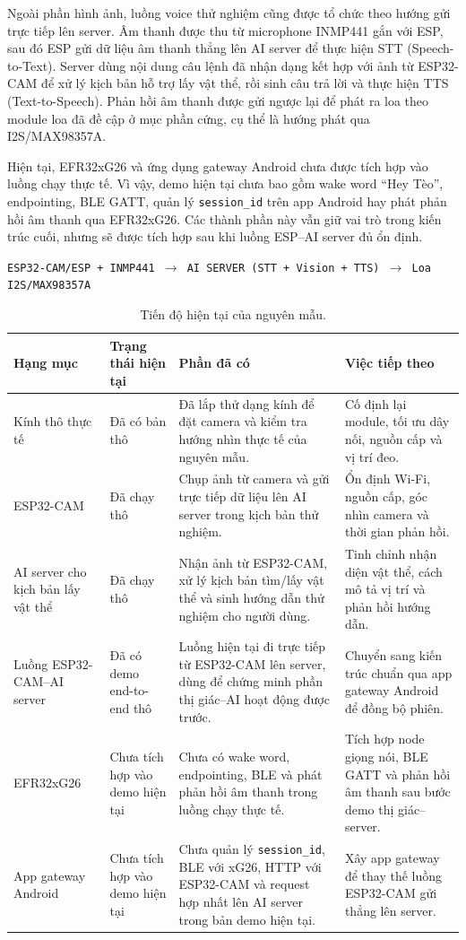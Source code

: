 \documentclass[11pt,a4paper]{article}
\begin{document}
Ngoài phần hình ảnh, luồng voice thử nghiệm cũng được tổ chức theo hướng gửi trực tiếp lên server. Âm thanh được thu từ microphone INMP441 gắn với ESP, sau đó ESP gửi dữ liệu âm thanh thẳng lên AI server để thực hiện STT (Speech-to-Text). Server dùng nội dung câu lệnh đã nhận dạng kết hợp với ảnh từ ESP32-CAM để xử lý kịch bản hỗ trợ lấy vật thể, rồi sinh câu trả lời và thực hiện TTS (Text-to-Speech). Phản hồi âm thanh được gửi ngược lại để phát ra loa theo module loa đã đề cập ở mục phần cứng, cụ thể là hướng phát qua I2S/MAX98357A.

Hiện tại, EFR32xG26 và ứng dụng gateway Android chưa được tích hợp vào luồng chạy thực tế. Vì vậy, demo hiện tại chưa bao gồm wake word ``Hey Tèo'', endpointing, BLE GATT, quản lý \texttt{session\_id} trên app Android hay phát phản hồi âm thanh qua EFR32xG26. Các thành phần này vẫn giữ vai trò trong kiến trúc cuối, nhưng sẽ được tích hợp sau khi luồng ESP--AI server đủ ổn định.

\begin{center}
\texttt{ESP32-CAM/ESP + INMP441 $\rightarrow$ AI SERVER (STT + Vision + TTS) $\rightarrow$ Loa I2S/MAX98357A}
\end{center}

\begin{table}[H]
\centering
\caption{Tiến độ hiện tại của nguyên mẫu.}
\small
\begin{tabularx}{\textwidth}{p{3.0cm}p{2.4cm}Y Y}
\toprule
\textbf{Hạng mục} & \textbf{Trạng thái hiện tại} & \textbf{Phần đã có} & \textbf{Việc tiếp theo} \\
\midrule
Kính thô thực tế & Đã có bản thô & Đã lắp thử dạng kính để đặt camera và kiểm tra hướng nhìn thực tế của nguyên mẫu. & Cố định lại module, tối ưu dây nối, nguồn cấp và vị trí đeo. \\
ESP32-CAM & Đã chạy thô & Chụp ảnh từ camera và gửi trực tiếp dữ liệu lên AI server trong kịch bản thử nghiệm. & Ổn định Wi-Fi, nguồn cấp, góc nhìn camera và thời gian phản hồi. \\
AI server cho kịch bản lấy vật thể & Đã chạy thô & Nhận ảnh từ ESP32-CAM, xử lý kịch bản tìm/lấy vật thể và sinh hướng dẫn thử nghiệm cho người dùng. & Tinh chỉnh nhận diện vật thể, cách mô tả vị trí và phản hồi hướng dẫn. \\
Luồng ESP32-CAM--AI server & Đã có demo end-to-end thô & Luồng hiện tại đi trực tiếp từ ESP32-CAM lên server, dùng để chứng minh phần thị giác--AI hoạt động được trước. & Chuyển sang kiến trúc chuẩn qua app gateway Android để đồng bộ phiên. \\
EFR32xG26 & Chưa tích hợp vào demo hiện tại & Chưa có wake word, endpointing, BLE và phát phản hồi âm thanh trong luồng chạy thực tế. & Tích hợp node giọng nói, BLE GATT và phản hồi âm thanh sau bước demo thị giác--server. \\
App gateway Android & Chưa tích hợp vào demo hiện tại & Chưa quản lý \texttt{session\_id}, BLE với xG26, HTTP với ESP32-CAM và request hợp nhất lên AI server trong bản demo hiện tại. & Xây app gateway để thay thế luồng ESP32-CAM gửi thẳng lên server. \\
\bottomrule
\end{tabularx}
\end{table}
\end{document}
